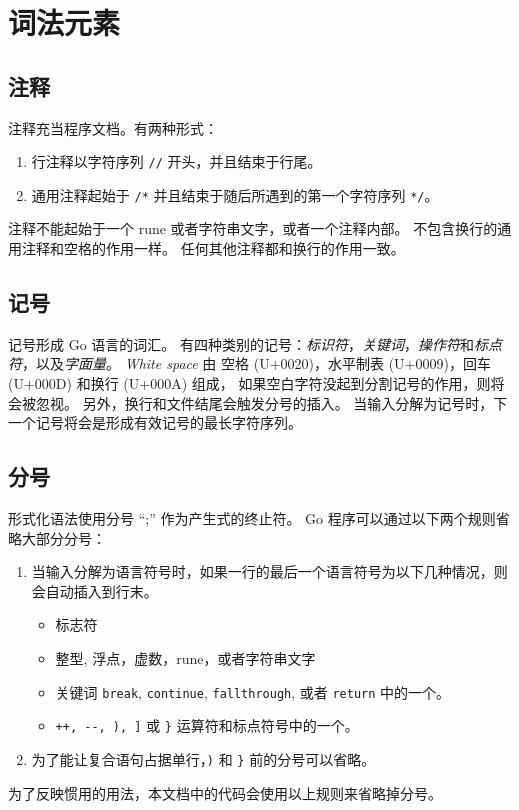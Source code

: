 
\chapter{词法元素}

\section{注释}
注释充当程序文档。有两种形式：
\begin{enumerate}
    \item 行注释以字符序列 \verb|//| 开头，并且结束于行尾。
    \item 通用注释起始于 \verb|/*| 并且结束于随后所遇到的第一个字符序列 \verb|*/|。
\end{enumerate}
注释不能起始于一个 rune 或者字符串文字，或者一个注释内部。
不包含换行的通用注释和空格的作用一样。
任何其他注释都和换行的作用一致。

\section{记号}
记号形成 Go 语言的词汇。
有四种类别的记号：\emph{标识符}，\emph{关键词}，\emph{操作符}和\emph{标点符}，以及\emph{字面量}。
\emph{White space} 由 空格 (U+0020)，水平制表 (U+0009)，回车 (U+000D) 和换行 (U+000A) 组成，
如果空白字符没起到分割记号的作用，则将会被忽视。
另外，换行和文件结尾会触发分号的插入。
当输入分解为记号时，下一个记号将会是形成有效记号的最长字符序列。

\section{分号}
形式化语法使用分号 ``;'' 作为产生式的终止符。
Go 程序可以通过以下两个规则省略大部分分号：
\begin{enumerate}
\item 当输入分解为语言符号时，如果一行的最后一个语言符号为以下几种情况，则会自动插入到行末。
	\begin{itemize}
		\item 标志符
		\item 整型, 浮点，虚数，rune，或者字符串文字
		\item 关键词 \verb|break|, \verb|continue|, \verb|fallthrough|, 或者 \verb|return| 中的一个。
		\item \verb|++, --, ), ]| 或 \verb|}| 运算符和标点符号中的一个。
	\end{itemize}
\item 为了能让复合语句占据单行，\verb|)| 和 \verb|}| 前的分号可以省略。 
\end{enumerate}
为了反映惯用的用法，本文档中的代码会使用以上规则来省略掉分号。


